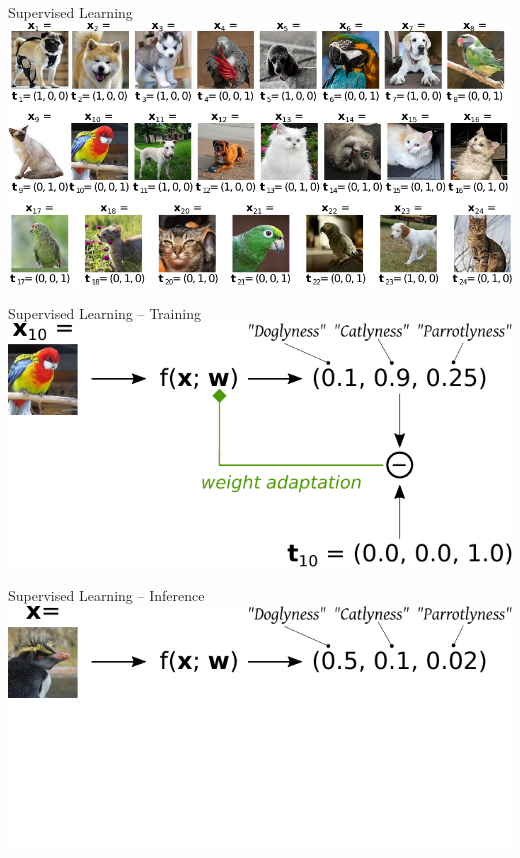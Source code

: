 \documentclass[handout,aspectratio=169]{beamer}
\begin{document}
	\begin{frame}{Supervised Learning}
		\centering
		\includegraphics[scale=0.95]{media/learning_example_supervised.pdf}
	\end{frame}

	\begin{frame}{Supervised Learning -- Training}
		\centering
		\includegraphics[scale=0.95]{media/learning_example_supervised_2.pdf}
	\end{frame}

	\begin{frame}{Supervised Learning -- Inference}
		\centering
		\includegraphics[scale=0.95]{media/learning_example_supervised_3.pdf}
	\end{frame}
\end{document}
